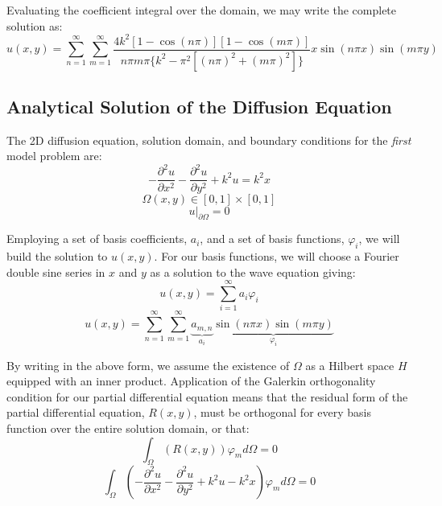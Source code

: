 \documentclass[10pt]{article}		%
\numberwithin{equation}{section}
\newcommand{\psder}[2]{\dfrac{\partial^2#1}{\partial#2^2}}		%
\begin{document}
Evaluating the coefficient integral over the domain, we may write the complete solution as:
\begin{equation}
u(x,y) = \sum_{n=1}^{\infty} \sum_{m=1}^{\infty} \frac{4k^2[1-\cos(n\pi)][1-\cos(m\pi)]}{n\pi m\pi\{k^2-\pi^2[(n\pi)^2+(m\pi)^2]\}}  x\sin(n\pi x)\sin(m\pi y)
\end{equation}

\newpage

\subsection{Analytical Solution of the Diffusion Equation}

The 2D diffusion equation, solution domain, and boundary conditions for the \textit{first} model problem are:
\begin{equation}
-\psder{u}{x} - \psder{u}{y} + k^2u = k^2x
\end{equation}
\begin{equation}
\Omega(x,y) \in [0, 1] \times [0, 1]
\end{equation}
\begin{equation}
u \big|_{\partial \Omega} = 0
\end{equation}

Employing a set of basis coefficients, $a_i$, and a set of basis functions, $\varphi_i$, we will build the solution to $u(x ,y)$. For our basis functions, we will choose a Fourier double sine series in $x$ and $y$ as a solution to the wave equation giving:
\begin{equation}
u(x,y) = \sum_{i=1}^{\infty} a_{i} \varphi_i
\end{equation}
\begin{equation}
u(x,y) = \sum_{n=1}^{\infty} \sum_{m=1}^{\infty} \underbrace{a_{m,n}}_{a_i} \underbrace{\sin(n\pi x)\sin(m\pi y)}_{\varphi_i}
\end{equation}

By writing in the above form, we assume the existence of $\Omega$ as a Hilbert space $H$ equipped with an inner product. Application of the Galerkin orthogonality condition for our partial differential equation means that the residual form of the partial differential equation, $R(x, y)$, must be orthogonal for every basis function over the entire solution domain, or that:
\begin{equation}
\int_{\Omega}(R(x,y)) \varphi_m d\Omega = 0
\end{equation}
\begin{equation}
\int_{\Omega}\left(-\psder{u}{x} - \psder{u}{y} + k^2u - k^2x\right) \varphi_m d\Omega = 0
\end{equation}
\end{document}
